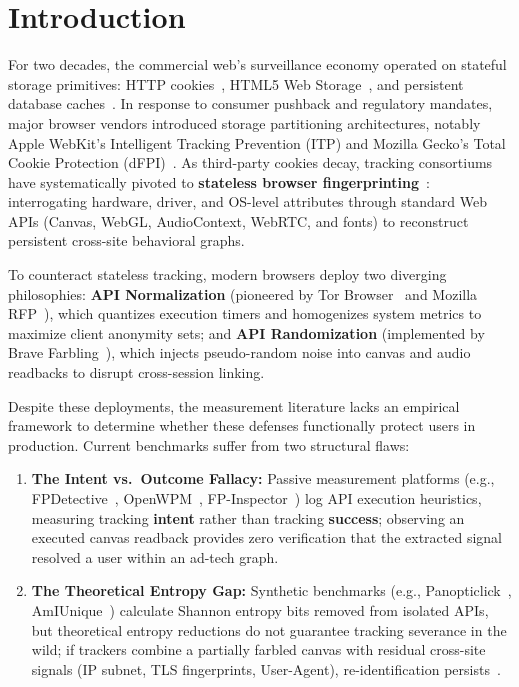 \section{Introduction}
\label{sec:intro}

For two decades, the commercial web's surveillance economy operated on stateful storage primitives: HTTP cookies~\cite{rfc6265, rfc7231, rfc9110}, HTML5 Web Storage~\cite{whatwg_webstorage}, and persistent database caches~\cite{lerner2016internet}. 
In response to consumer pushback and regulatory mandates, major browser vendors introduced storage partitioning architectures, notably Apple WebKit's Intelligent Tracking Prevention (ITP) and Mozilla Gecko's Total Cookie Protection (dFPI)~\cite{papadogiannakis2021user, randall2022measuring}. 
As third-party cookies decay, tracking consortiums have systematically pivoted to \textbf{stateless browser fingerprinting}~\cite{mowery2012pixel, nikiforakis2013cookieless, acar2014web, cao2017cross, bujlow2017survey, laperdrix2020browser}: interrogating hardware, driver, and OS-level attributes through standard Web APIs (Canvas, WebGL, AudioContext, WebRTC, and fonts) to reconstruct persistent cross-site behavioral graphs.

To counteract stateless tracking, modern browsers deploy two diverging philosophies: \textbf{API Normalization} (pioneered by Tor Browser~\cite{tor_design, torbrowser_normalization_2019} and Mozilla RFP~\cite{mozilla_rfp_docs}), which quantizes execution timers and homogenizes system metrics to maximize client anonymity sets; 
and \textbf{API Randomization} (implemented by Brave Farbling~\cite{brave_fingerprinting_protections_2025}), which injects pseudo-random noise into canvas and audio readbacks to disrupt cross-session linking.

Despite these deployments, the measurement literature lacks an empirical framework to determine whether these defenses functionally protect users in production. Current benchmarks suffer from two structural flaws:
\begin{enumerate}
    \item \textbf{The Intent vs.\ Outcome Fallacy:} Passive measurement platforms (e.g., FPDetective~\cite{acar2013fpdetective}, OpenWPM~\cite{englehardt2016openwpm}, FP-Inspector~\cite{iqbal2021fingerprinting}) log API execution heuristics, measuring tracking \textbf{intent} rather than tracking \textbf{success};
    observing an executed canvas readback provides zero verification that the extracted signal resolved a user within an ad-tech graph.
    \item \textbf{The Theoretical Entropy Gap:} Synthetic benchmarks (e.g., Panopticlick~\cite{eckersley2010unique}, AmIUnique~\cite{laperdrix2016amiunique}) calculate Shannon entropy bits removed from isolated APIs, but theoretical entropy reductions do not guarantee tracking severance in the wild; 
    if trackers combine a partially farbled canvas with residual cross-site signals (IP subnet, TLS fingerprints, User-Agent), re-identification persists~\cite{vastel2018fp, sjosten2021essentialfp}.
\end{enumerate}

